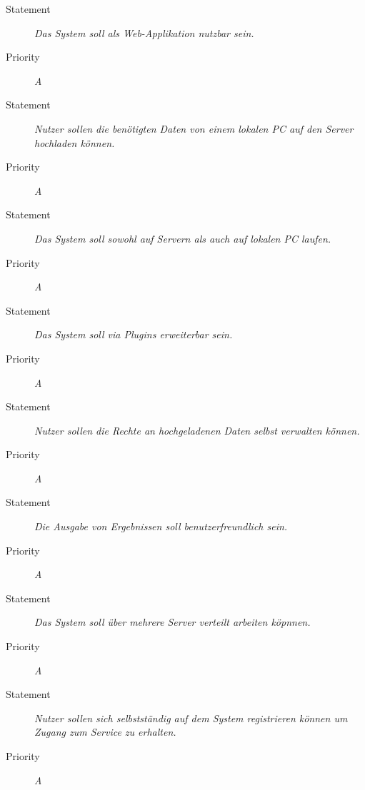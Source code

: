 \UR
\begin{description}
\item [Statement] \textit{Das System soll als \gls{Web-Applikation} nutzbar sein.}
\item [Priority] \textit{A}
\end{description}

\UR
\begin{description}
\item[Statement] \textit{Nutzer sollen die benötigten Daten von einem lokalen PC auf den Server hochladen können.}
\item[Priority] \textit{A}
\end{description}

\UR
\begin{description}
\item[Statement] \textit{Das System soll sowohl auf Servern als auch auf lokalen PC laufen.}
\item[Priority] \textit{A}
\end{description}

\UR
\begin{description}
\item[Statement] \textit{Das System soll via \gls{Plugins} erweiterbar sein.}
\item[Priority] \textit{A}
\end{description}

\UR
\begin{description}
\item[Statement] \textit{Nutzer sollen die Rechte an hochgeladenen Daten selbst verwalten können.}
\item[Priority] \textit{A}
\end{description}

\UR
\begin{description}
\item[Statement] \textit{Die Ausgabe von Ergebnissen soll benutzerfreundlich sein.}
\item[Priority] \textit{A}
\end{description}

\UR
\begin{description}
\item[Statement] \textit{Das System soll über mehrere Server verteilt arbeiten köpnnen.}
\item[Priority] \textit{A}
\end{description}

\UR
\begin{description}
\item[Statement] \textit{Nutzer sollen sich selbstständig auf dem System registrieren können um Zugang zum Service zu erhalten.}
\item[Priority] \textit{A}
\end{description}

